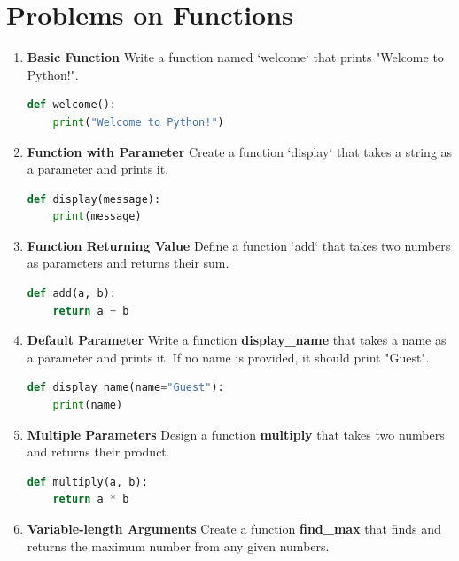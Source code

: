 \documentclass[12pt]{book}
\begin{document}
\section{Problems on Functions}

\begin{enumerate}
  \item \textbf{Basic Function}
Write a function named `welcome` that prints "Welcome to Python!".


\begin{lstlisting}[language=Python]
def welcome():
    print("Welcome to Python!")
\end{lstlisting}

\item \textbf{ Function with Parameter}
Create a function `display` that takes a string as a parameter and prints it.


\begin{lstlisting}[language=Python]
def display(message):
    print(message)
\end{lstlisting}

\item \textbf{Function Returning Value}
Define a function `add` that takes two numbers as parameters and returns their sum.


\begin{lstlisting}[language=Python]
def add(a, b):
    return a + b
\end{lstlisting}

\item \textbf{Default Parameter}
Write a function \textbf{display\_name} that takes a name as a parameter and prints it. If no name is provided, it should print "Guest".


\begin{lstlisting}[language=Python]
def display_name(name="Guest"):
    print(name)
\end{lstlisting}

\item \textbf{Multiple Parameters}
Design a function \textbf{multiply} that takes two numbers and returns their product.

\begin{lstlisting}[language=Python]
def multiply(a, b):
    return a * b
\end{lstlisting}

\item \textbf{Variable-length Arguments}
Create a function \textbf{find\_max} that finds and returns the maximum number from any given numbers.



\end{enumerate}
\end{document}
